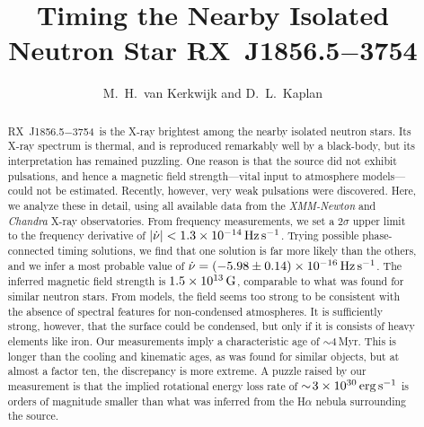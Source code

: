 \documentclass{emulateapj}\usepackage{apjfonts}
\newcommand{\rxj}{RX~J1856.5$-$3754}
\newcommand{\expnt}[2]{\ensuremath{#1 \times 10^{#2}}}   %
\begin{document}
\title{Timing the Nearby Isolated Neutron Star \rxj}

\author{M.~H.~van Kerkwijk and D.~L.~Kaplan}




\begin{abstract}
\rxj\ is the X-ray brightest among the nearby isolated neutron stars.
Its X-ray spectrum is thermal, and is reproduced remarkably well by a
black-body, but its interpretation has remained puzzling.  One reason
is that the source did not exhibit pulsations, and hence a magnetic
field strength---vital input to atmosphere models---could not be
estimated.  Recently, however, very weak pulsations were discovered.
Here, we analyze these in detail, using all available data from the
{\em XMM-Newton} and {\em Chandra} X-ray observatories.  From
frequency measurements, we set a 2$\sigma$ upper limit to the
frequency derivative of $|\dot\nu|<
1.3\times10^{-14}{\rm\,Hz\,s^{-1}}$.  Trying possible phase-connected
timing solutions, we find that one solution is far more likely than
the others, and we infer a most probable value of $\dot\nu =
(-5.98\pm0.14)\times 10^{-16}{\rm\,Hz\,s^{-1}}$.  The inferred
magnetic field strength is $1.5\times10^{13}{\rm\,G}$, comparable to
what was found for similar neutron stars.  From models, the field
seems too strong to be consistent with the absence of spectral
features for non-condensed atmospheres.  It is sufficiently strong,
however, that the surface could be condensed, but only if it is
consists of heavy elements like iron.  Our measurements imply a
characteristic age of $\sim\!4\,$Myr.  This is longer than the cooling
and kinematic ages, as was found for similar objects, but at almost a
factor ten, the discrepancy is more extreme.  A puzzle raised by our
measurement is that the implied rotational energy loss rate of
$\sim\!\expnt{3}{30}{\rm\,erg\,s}^{-1}$ is orders of magnitude smaller
than what was inferred from the H$\alpha$ nebula surrounding the
source.
\end{abstract}
\end{document}
